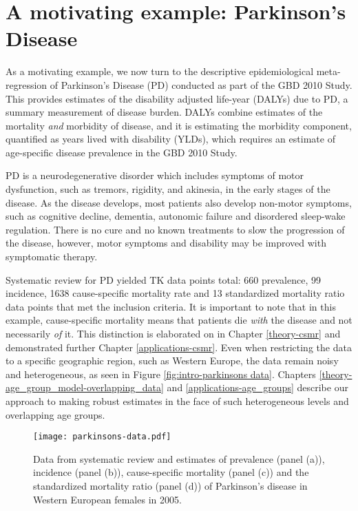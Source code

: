 \section{A motivating example: Parkinson's Disease}
\label{intro-complete_ex}

As a motivating example, we now turn to the descriptive
epidemiological meta-regression of Parkinson's Disease (PD) conducted
as part of the GBD 2010 Study.  This provides estimates of the
disability adjusted life-year (DALYs) due to PD, a summary measurement
of disease burden.  DALYs combine estimates of the mortality
\emph{and} morbidity of disease, and it is estimating the morbidity
component, quantified as years lived with disability (YLDs), which
requires an estimate of age-specific disease prevalence in the GBD
2010 Study.

PD is a neurodegenerative disorder which includes symptoms of motor
dysfunction, such as tremors, rigidity, and akinesia, in the early
stages of the disease.  As the disease develops, most patients also
develop non-motor symptoms, such as cognitive decline, dementia,
autonomic failure and disordered sleep-wake regulation.  There is no
cure and no known treatments to slow the progression of the disease,
however, motor symptoms and disability may be improved with
symptomatic therapy.\cite{poewe_natural_2006, pollock_prevalence_1966}

Systematic review for PD yielded TK data points total: 660 prevalence,
99 incidence, 1638 cause-specific mortality rate and 13 standardized
mortality ratio data points that met the inclusion criteria.  It is
important to note that in this example, cause-specific mortality means
that patients die \emph{with} the disease and not necessarily
\emph{of} it.  This distinction is elaborated on in Chapter
\ref{theory-csmr} and demonstrated further Chapter
\ref{applications-csmr}.  Even when restricting the data to a specific
geographic region, such as Western Europe, the data remain noisy and
heterogeneous, as seen in Figure \ref{fig:intro-parkinsons
  data}. Chapters \ref{theory-age_group_model-overlapping_data} and
\ref{applications-age_groups} describe our approach to making robust
estimates in the face of such heterogeneous levels and overlapping age
groups.

    \begin{figure}[h]
        \begin{center}
            \texttt{[image: parkinsons-data.pdf]}
            \caption{Data from systematic review and estimates of
              prevalence (panel (a)), incidence (panel (b)),
              cause-specific mortality (panel (c)) and the
              standardized mortality ratio (panel (d)) of Parkinson's
              disease in Western European females in 2005.}
            \label{fig:intro-parkinsons data}
        \end{center}
    \end{figure} 

